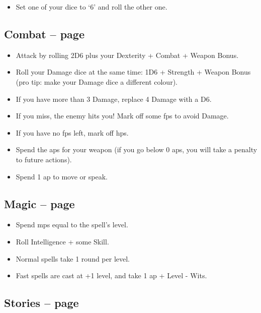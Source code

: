 \begin{multicols}{2}
\begin{itemize}
  \item{Set one of your dice to `6' and roll the other one.}
  
\end{itemize}

\subsection{Combat -- page \pageref{attack}}

\begin{itemize}
  \item
  Attack by rolling 2D6 plus your Dexterity + Combat + Weapon Bonus.
  \item
  Roll your Damage dice at the same time: 1D6 + Strength + Weapon Bonus (pro tip: make your Damage dice a different colour).
  \item
  If you have more than 3 Damage, replace 4 Damage with a D6.
  \item
  If you miss, the enemy hits you!
  Mark off some \glspl{fp} to avoid Damage.
  \item
  If you have no \glspl{fp} left, mark off \glspl{hp}.
  \item
  Spend the \glspl{ap} for your weapon (if you go below 0 \glspl{ap}, you will take a penalty to future actions).
  \item
  Spend 1 \gls{ap} to move or speak.
\end{itemize}

\subsection{Magic -- page \pageref{basiccasting}}

\begin{itemize}

  \item
  Spend \glspl{mp} equal to the spell's level.
  \item
  Roll Intelligence + some Skill.
  \item
  Normal spells take 1 round per level.
  \item
  Fast spells are cast at +1 level, and take 1 \gls{ap} + Level - Wits.

\end{itemize}

\subsection{Stories -- page \pageref{stories}}


\end{multicols}
